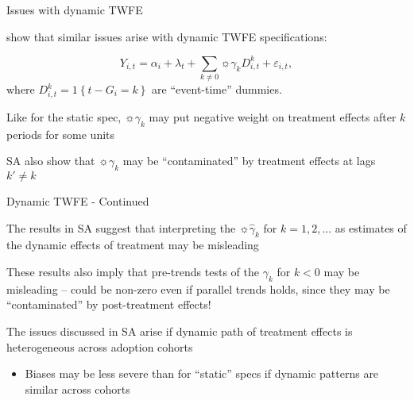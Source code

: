 \documentclass[aspectratio = 169, 13pt]{beamer}
\begin{document}
\begin{frame}{Issues with dynamic TWFE}
  \begin{wideitemize}
    \item
    \citet{sun_estimating_2020} show that similar issues arise with dynamic TWFE specifications:

    \begin{equation*}
      Y_{i,t} = \alpha_i + \lambda_t +  \sum_{k \neq 0} \sun{ \gamma_k D_{i,t}^{k}} + \varepsilon_{i,t},
    \end{equation*}
    where $D_{i,t}^{k} = 1\left\{t-G_{i}=k\right\}$ are ``event-time'' dummies.

    \item
    Like for the static spec, $\sun{\gamma_k}$ may put negative weight on treatment effects after $k$ periods for some units

    \item
    SA also show that $\sun{\gamma_k}$ may be ``contaminated'' by treatment effects at lags $k' \neq k$


  \end{wideitemize}

\end{frame}


\begin{frame}{Dynamic TWFE - Continued}

  \begin{wideitemize}

    \item
    The results in SA suggest that interpreting the $\sun{\hat\gamma_k}$ for $k=1,2,...$ as estimates of the dynamic effects of treatment may be misleading


    \item
    These results also imply that pre-trends tests of the $\gamma_k$ for $k<0$ may be misleading -- could be non-zero even if parallel trends holds, since they may be ``contaminated'' by post-treatment effects!
    \pause

    \item
    The issues discussed in SA arise if dynamic path of treatment effects is heterogeneous across adoption cohorts
    \begin{itemize}
      \item
            Biases may be less severe than for ``static'' specs if dynamic patterns are similar across cohorts
    \end{itemize}


  \end{wideitemize}

\end{frame}
\end{document}
